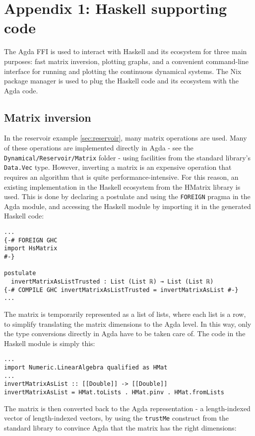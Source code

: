 \chapter{Appendix 1: Haskell supporting code}
\label{app:haskell}

The Agda FFI is used to interact with Haskell and its ecosystem for three main purposes: fast matrix inversion, plotting graphs, and a convenient command-line interface for running and plotting the continuous dynamical systems. The Nix package manager \cite{nix} is used to plug the Haskell code and its ecosystem with the Agda code.

\section{Matrix inversion}
In the reservoir example \ref{sec:reservoir}, many matrix operations are used. Many of these operations are implemented directly in Agda - see the \texttt{Dynamical/Reservoir/Matrix} folder - using facilities from the standard library's \texttt{Data.Vec} type. However, inverting a matrix is an expensive operation that requires an algorithm that is quite performance-intensive. For this reason, an existing implementation in the Haskell ecosystem from the HMatrix \cite{hmatrix} library is used. This is done by declaring a postulate and using the \texttt{FOREIGN} pragma in the Agda module, and accessing the Haskell module by importing it in the generated Haskell code:
\begin{verbatim}
...
{-# FOREIGN GHC
import HsMatrix
#-}

postulate
  invertMatrixAsListTrusted : List (List ℝ) → List (List ℝ)
{-# COMPILE GHC invertMatrixAsListTrusted = invertMatrixAsList #-}
...
\end{verbatim}
The matrix is temporarily represented as a list of lists, where each list is a row, to simplify translating the matrix dimensions to the Agda level. In this way, only the type conversions directly in Agda have to be taken care of. The code in the Haskell module is simply this:
\begin{verbatim}
...
import Numeric.LinearAlgebra qualified as HMat
...
invertMatrixAsList :: [[Double]] -> [[Double]]
invertMatrixAsList = HMat.toLists . HMat.pinv . HMat.fromLists
\end{verbatim}

The matrix is then converted back to the Agda representation - a length-indexed vector of length-indexed vectors, by using the \texttt{trustMe} construct from the standard library to convince Agda that the matrix has the right dimensions:

